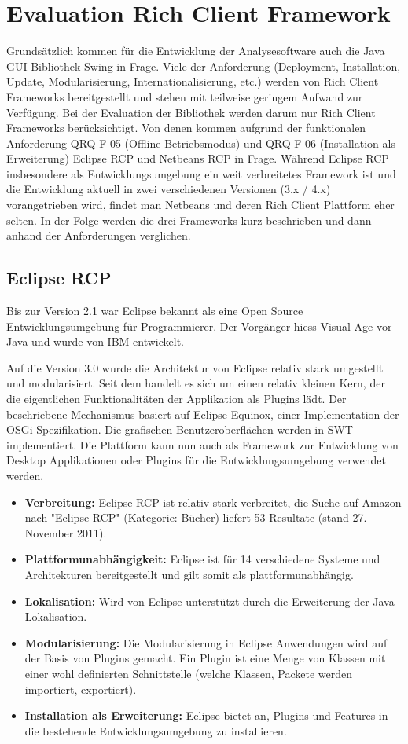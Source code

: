 \section{Evaluation Rich Client Framework}
Grundsätzlich kommen für die Entwicklung der Analysesoftware auch die Java GUI-Bibliothek Swing in Frage. Viele der Anforderung (Deployment, Installation, Update, Modularisierung, Internationalisierung, etc.) werden von Rich Client Frameworks bereitgestellt und stehen mit teilweise geringem Aufwand zur Verfügung. Bei der Evaluation der Bibliothek werden darum nur Rich Client Frameworks berücksichtigt. Von denen kommen aufgrund der funktionalen Anforderung QRQ-F-05 (Offline Betriebsmodus) und QRQ-F-06 (Installation als Erweiterung) Eclipse RCP und Netbeans RCP in Frage. Während Eclipse RCP insbesondere als Entwicklungsumgebung ein weit verbreitetes Framework ist und die Entwicklung aktuell in zwei verschiedenen Versionen (3.x / 4.x) vorangetrieben wird, findet man Netbeans und deren Rich Client Plattform eher selten. In der Folge werden die drei Frameworks kurz beschrieben und dann anhand der Anforderungen verglichen.


\subsection{Eclipse RCP}
Bis zur Version 2.1 war Eclipse bekannt als eine Open Source Entwicklungsumgebung für Programmierer. Der Vorgänger hiess Visual Age vor Java und wurde von IBM entwickelt. 

Auf die Version 3.0 wurde die Architektur von Eclipse relativ stark umgestellt und modularisiert. Seit dem handelt es sich um einen relativ kleinen Kern, der die eigentlichen Funktionalitäten der Applikation als Plugins lädt. Der beschriebene Mechanismus basiert auf Eclipse Equinox, einer Implementation der OSGi Spezifikation. Die grafischen Benutzeroberflächen werden in SWT implementiert. Die Plattform kann nun auch als Framework zur Entwicklung von Desktop Applikationen oder Plugins für die Entwicklungsumgebung  verwendet werden.

\begin{itemize}
\item \textbf{Verbreitung:} Eclipse RCP ist relativ stark verbreitet, die Suche auf Amazon nach "Eclipse RCP" (Kategorie: Bücher) liefert 53 Resultate (stand 27. November 2011).
\item \textbf{Plattformunabhängigkeit:} Eclipse ist für 14 verschiedene Systeme und Architekturen bereitgestellt und gilt somit als plattformunabhängig\cite{wiki:eclipse}.
\item \textbf{Lokalisation:} Wird von Eclipse unterstützt durch die Erweiterung der Java-Lokalisation.
\item \textbf{Modularisierung:} Die Modularisierung in Eclipse Anwendungen wird auf der Basis von Plugins gemacht. Ein Plugin ist eine Menge von Klassen mit einer wohl definierten Schnittstelle (welche Klassen, Packete werden importiert, exportiert).
\item \textbf{Installation als Erweiterung:} Eclipse bietet an, Plugins und Features in die bestehende Entwicklungsumgebung zu installieren.
\end{itemize}

